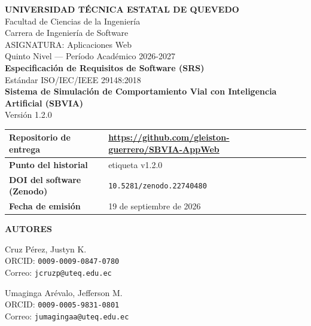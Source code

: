 \documentclass[11pt,a4paper]{article}
\begin{document}
\begin{titlepage}
    \centering
    \vspace*{1cm}
    {\LARGE \textbf{UNIVERSIDAD TÉCNICA ESTATAL DE QUEVEDO}}\\[0.5cm]
    {\large Facultad de Ciencias de la Ingeniería}\\[0.2cm]
    {\large Carrera de Ingeniería de Software}\\[0.8cm]
    
    {\large ASIGNATURA: Aplicaciones Web}\\[0.2cm]
    {\large Quinto Nivel — Período Académico 2026-2027}\\[1cm]
    
    {\Huge \bfseries Especificación de Requisitos de Software (SRS)}\\[0.5cm]
    {\large Estándar ISO/IEC/IEEE 29148:2018}\\[1cm]
    
    {\huge \bfseries \color{uteqblue} Sistema de Simulación de Comportamiento Vial con Inteligencia Artificial (SBVIA)}\\[0.5cm]
    {\Large Versión 1.2.0}\\[1cm]
    
    \begin{table}[h]
        \centering
        \renewcommand{\arraystretch}{1.5}
        \begin{tabularx}{\textwidth}{|l|X|}
            \hline
            \textbf{Repositorio de entrega} & \url{https://github.com/gleiston-guerrero/SBVIA-AppWeb} \\ \hline
            \textbf{Punto del historial} & etiqueta v1.2.0 \\ \hline
            \textbf{DOI del software (Zenodo)} & \texttt{10.5281/zenodo.22740480} \\ \hline
            \textbf{Fecha de emisión} & 19 de septiembre de 2026 \\ \hline
        \end{tabularx}
    \end{table}

    \vfill

    {\Large \textbf{AUTORES}}\\[0.5cm]
    \begin{minipage}{0.45\textwidth}
        \centering
        {\large Cruz Pérez, Justyn K.}\\[0.1cm]
        {\small ORCID: \texttt{0009-0009-0847-0780}}\\[0.1cm]
        {\small Correo: \texttt{jcruzp@uteq.edu.ec}}
    \end{minipage}
    \hfill
    \begin{minipage}{0.45\textwidth}
        \centering
        {\large Umaginga Arévalo, Jefferson M.}\\[0.1cm]
        {\small ORCID: \texttt{0009-0005-9831-0801}}\\[0.1cm]
        {\small Correo: \texttt{jumagingaa@uteq.edu.ec}}
    \end{minipage}
    \vspace{1cm}


\end{titlepage}
\end{document}
